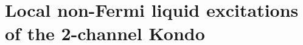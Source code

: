 \documentclass[reprint,prb,superscriptaddress]{revtex4-2}
\begin{document}





\section{Local non-Fermi liquid excitations of the 2-channel Kondo}
\end{document}
